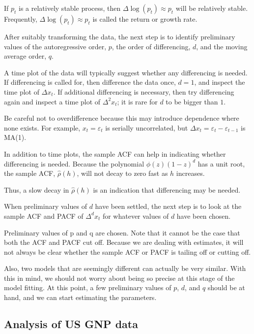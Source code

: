 \documentclass[
paper=128mm:96mm, %
fontsize=9.5pt, %
pagesize, %
parskip=half-, %
]{scrartcl} %
\theoremstyle{mythmstyle} %
\begin{document}
If $p_t$ is a relatively stable process, then $\Delta\log(p_t)\approx p_t$ will be relatively stable. Frequently, $\Delta\log(p_t)\approx p_t$ is called the return or growth rate. 
\clearpage

After suitably transforming the data, the next step is to identify preliminary values of the autoregressive order, $p$, the order of differencing, $d$, and the moving average order, $q$. 

A time plot of the data will typically suggest whether any differencing is needed. If differencing is called for, then difference the data once, $d = 1$, and inspect the time plot of $\Delta x_t$. If additional differencing is necessary, then try differencing again and inspect a time plot of $\Delta^2 x_t$; it is rare for $d$ to be bigger than $1$. 

Be careful not to overdifference because this may introduce dependence where none exists. For example, $x_t=\varepsilon_t$ is serially uncorrelated, but $\Delta x_t=\varepsilon_t-\varepsilon_{t-1}$ is MA(1). 

In addition to time plots, the sample ACF can help in indicating whether differencing is needed. Because the polynomial
$\phi(z)(1-z)^d$ has a unit root, the sample ACF, $\widehat{\rho}(h)$, will not decay to zero fast as $h$ increases. 

Thus, a slow decay in $\widehat{\rho}(h)$ is an indication that differencing may be needed.
\clearpage

When preliminary values of $d$ have been settled, the next step is to look at the sample ACF and PACF of $\Delta^d x_t$ for whatever values of $d$ have been chosen. 

Preliminary values of p and q are chosen. Note that it cannot be the case that both the ACF and PACF cut off. Because we are dealing with estimates, it will not always be clear whether the sample ACF or PACF is tailing off or cutting off. 

Also, two models that are seemingly different can actually be very similar. With this in mind, we should not worry about being so precise at this stage of the model fitting. At this point, a few preliminary values of $p$, $d$, and $q$ should be at hand, and we can start estimating the parameters.
\clearpage

\subsection{Analysis of US GNP data}
\end{document}
